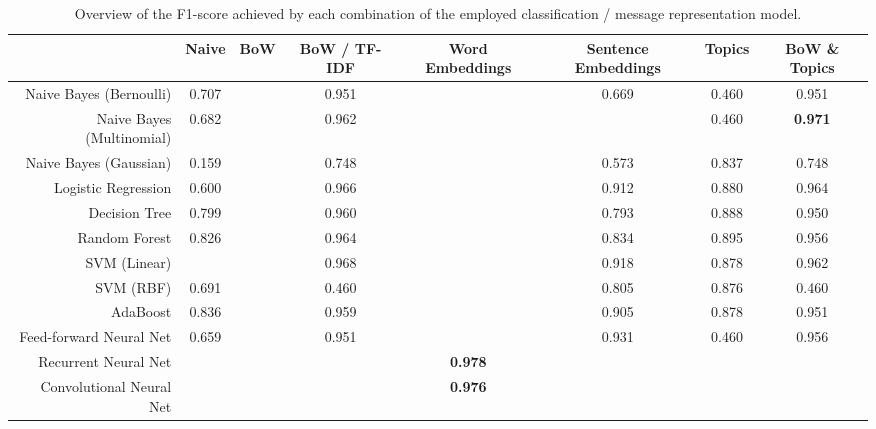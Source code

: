 \documentclass[letterpaper]{article}
\begin{document}
\begin{landscape}
	\begin{table}[t!]
		\centering
		\caption{Overview of the F1-score achieved by each combination of the employed classification / message representation model.}
		\label{tb: macro_f1}
		\begin{tabular}{@{}rccccccc@{}}
			\toprule
			                                               & Naive & BoW & BoW / TF-IDF & Word Embeddings & Sentence Embeddings & Topics & BoW \& Topics \\ \midrule
			\multicolumn{1}{r|}{Naive Bayes (Bernoulli)}   & 0.707 &     & 0.951        &                 & 0.669               & 0.460  & 0.951         \\
			\multicolumn{1}{r|}{Naive Bayes (Multinomial)} & 0.682 &     & 0.962        &                 &                     & 0.460  & \textbf{0.971}\\
			\multicolumn{1}{r|}{Naive Bayes (Gaussian)}    & 0.159 &     & 0.748        &                 & 0.573               & 0.837  & 0.748         \\
			\multicolumn{1}{r|}{Logistic Regression}       & 0.600 &     & 0.966        &                 & 0.912               & 0.880  & 0.964         \\
			\multicolumn{1}{r|}{Decision Tree}             & 0.799 &     & 0.960        &                 & 0.793               & 0.888  & 0.950         \\
			\multicolumn{1}{r|}{Random Forest}             & 0.826 &     & 0.964        &                 & 0.834               & 0.895  & 0.956         \\
			\multicolumn{1}{r|}{SVM (Linear)}              &       &     & 0.968        &                 & 0.918               & 0.878  & 0.962         \\
			\multicolumn{1}{r|}{SVM (RBF)}                 & 0.691 &     & 0.460        &                 & 0.805               & 0.876  & 0.460         \\
			\multicolumn{1}{r|}{AdaBoost}                  & 0.836 &     & 0.959        &                 & 0.905               & 0.878  & 0.951         \\
			\multicolumn{1}{r|}{Feed-forward Neural Net}   & 0.659 &     & 0.951        &                 & 0.931               & 0.460  & 0.956         \\
			\multicolumn{1}{r|}{Recurrent Neural Net}      &       &     &              & \textbf{0.978}  &                     &        &               \\
			\multicolumn{1}{r|}{Convolutional Neural Net}  &       &     &              & \textbf{0.976}  &                     &        &               \\ \bottomrule
		\end{tabular}
	\end{table}
\end{landscape}
\end{document}
